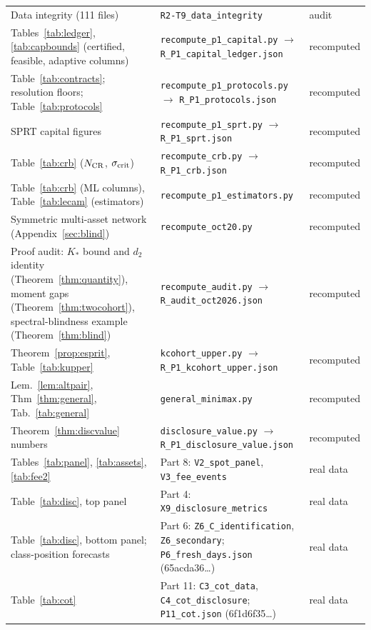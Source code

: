 \documentclass[12pt]{article}
\theoremstyle{definition}
\theoremstyle{remark}
\begin{document}
\begin{longtable}{p{}p{}p{}}
Data integrity (111 files) & \nolinkurl{R2-T9_data_integrity} & audit\\
Tables~\ref{tab:ledger}, \ref{tab:capbounds} (certified, feasible, adaptive columns) & \nolinkurl{recompute_p1_capital.py} $\to$ \nolinkurl{R_P1_capital_ledger.json} & recomputed\\
Table~\ref{tab:contracts}; resolution floors; Table~\ref{tab:protocols} & \nolinkurl{recompute_p1_protocols.py} $\to$ \nolinkurl{R_P1_protocols.json} & recomputed\\
SPRT capital figures & \nolinkurl{recompute_p1_sprt.py} $\to$ \nolinkurl{R_P1_sprt.json} & recomputed\\
Table~\ref{tab:crb} ($N_{\rm CR}$, $\sigma_{\rm crit}$) & \nolinkurl{recompute_crb.py} $\to$ \nolinkurl{R_P1_crb.json} & recomputed\\
Table~\ref{tab:crb} (ML columns), Table~\ref{tab:lecam} (estimators) & \nolinkurl{recompute_p1_estimators.py} & recomputed\\
Symmetric multi-asset network (Appendix~\ref{sec:blind}) & \nolinkurl{recompute_oct20.py} & recomputed\\
Proof audit: $K_*$ bound and $d_2$ identity (Theorem~\ref{thm:quantity}), moment gaps (Theorem~\ref{thm:twocohort}), spectral-blindness example (Theorem~\ref{thm:blind}) & \nolinkurl{recompute_audit.py} $\to$ \nolinkurl{R_audit_oct2026.json} & recomputed\\
Theorem~\ref{prop:esprit}, Table~\ref{tab:kupper} & \nolinkurl{kcohort_upper.py} $\to$ \nolinkurl{R_P1_kcohort_upper.json} & recomputed\\
Lem.~\ref{lem:altpair}, Thm~\ref{thm:general}, Tab.~\ref{tab:general} & \nolinkurl{general_minimax.py} & recomputed\\
Theorem~\ref{thm:discvalue} numbers & \nolinkurl{disclosure_value.py} $\to$ \nolinkurl{R_P1_disclosure_value.json} & recomputed\\
Tables~\ref{tab:panel}, \ref{tab:assets}, \ref{tab:fee2} & Part 8: \nolinkurl{V2_spot_panel}, \nolinkurl{V3_fee_events} & real data\\
Table~\ref{tab:disc}, top panel & Part 4: \nolinkurl{X9_disclosure_metrics} & real data\\
Table~\ref{tab:disc}, bottom panel; class-position forecasts & Part 6: \nolinkurl{Z6_C_identification}, \nolinkurl{Z6_secondary}; \nolinkurl{P6_fresh_days.json} (65acda36\ldots) & real data\\
Table~\ref{tab:cot} & Part 11: \nolinkurl{C3_cot_data}, \nolinkurl{C4_cot_disclosure}; \nolinkurl{P11_cot.json} (6f1d6f35\ldots) & real data\\

\end{longtable}
\end{document}
